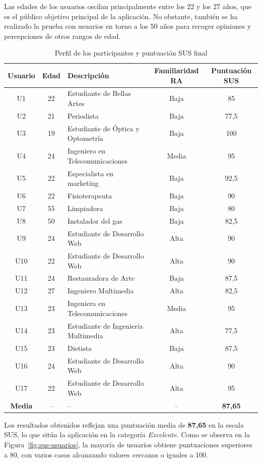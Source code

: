 Las edades de los usuarios oscilan principalmente entre los 22 y los 27 años, que es el público objetivo principal de la aplicación. No obstante, también se ha realizado la prueba con usuarios en torno a los 50 años para recoger opiniones y percepciones de otros rangos de edad.
\begin{table}[H]
\centering
\scriptsize
\renewcommand{\arraystretch}{1.2}
\begin{tabular}{|c|c|p{4cm}|c|c|}
\hline
\textbf{Usuario} & \textbf{Edad} & \textbf{Descripción} & \textbf{Familiaridad RA} & \textbf{Puntuación SUS} \\
\hline
U1 & 22 & Estudiante de Bellas Artes & Baja & 85 \\
U2 & 21 & Periodista & Baja & 77,5 \\
U3 & 19 & Estudiante de Óptica y Optometría& Baja & 100 \\
U4 & 24 & Ingeniero en Telecomunicaciones & Media & 95 \\
U5 & 22 & Especialista en marketing & Baja & 92,5 \\
U6 & 22 & Fisioterapeuta & Baja & 90 \\
U7 & 55 & Limpiadora & Baja & 80 \\
U8 & 50 & Instalador del gas & Baja & 82,5 \\
U9 & 24 & Estudiante de Desarrollo Web & Alta & 90 \\
U10 & 22 & Estudiante de Desarrollo Web & Alta & 90 \\
U11 & 24 & Restauradora de Arte & Baja & 87,5 \\
U12 & 27 & Ingeniero Multimedia & Alta & 82,5 \\
U13 & 23 & Ingeniera en Telecomunicaciones & Media & 95 \\
U14 & 23 & Estudiante de Ingeniería Multimedia & Alta & 77,5 \\
U15 & 23 & Dietista & Baja & 87,5 \\
U16 & 24 & Estudiante de Desarrollo Web & Alta & 90 \\
U17 & 22 & Estudiante de Desarrollo Web & Alta & 95 \\
\hline
\textbf{Media} & -- & -- & -- & \textbf{87,65} \\
\hline
\end{tabular}
\caption{Perfil de los participantes y puntuación SUS final}
\label{tab:sus-final}
\end{table}

Los resultados obtenidos reflejan una puntuación media de \textbf{87,65} en la escala SUS, lo que sitúa la aplicación en la categoría \textit{Excelente}. Como se observa en la Figura~\ref{fig:sus-usuarios}, la mayoría de usuarios obtiene puntuaciones superiores a 80, con varios casos alcanzando valores cercanos o iguales a 100. 

